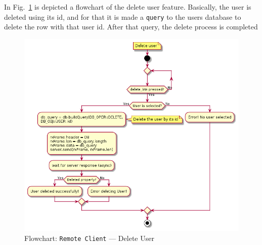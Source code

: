 In Fig.~\ref{fig:flow-rc-delete-user} is depicted a flowchart of the delete user feature.
Basically, the user is deleted using its id, and for that it is made a \texttt{query} to the users database to delete the row with that user id. After that query, the delete process is completed
%
\begin{figure}[htb!]
\centering
    \includegraphics[width=0.8\columnwidth]{./img/flow-rc-delete-user.png}
  \caption{Flowchart: \texttt{Remote Client} --- Delete User}%
\label{fig:flow-rc-delete-user}
\end{figure}

